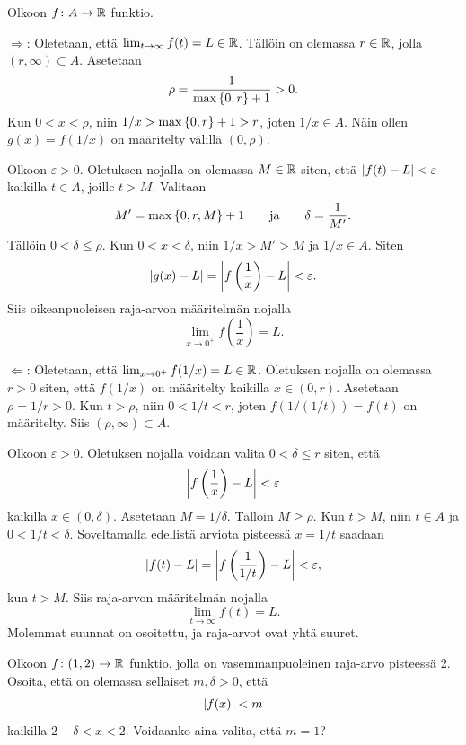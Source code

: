 \documentclass[11pt,a4paper]{amsart}
\begin{document}
\begin{solution}
  Olkoon \(f\colon A \to \RR\) funktio.

  \(\Rightarrow\): Oletetaan, että
  \(\lim_{t \to \infty} f(t) = L \in \RR\).
  Tällöin on olemassa \(r \in \RR\), jolla \((r,\infty) \subset A\).
  Asetetaan
  \[
    \rho = \frac{1}{\maxset{0,r} + 1} > 0.
  \]
  Kun \(0 < x < \rho\), niin
  \(1/x > \maxset{0,r} + 1 > r\), joten \(1/x \in A\).
  Näin ollen \(g(x) = f(1/x)\) on määritelty välillä \((0,\rho)\).

  Olkoon \(\varepsilon > 0\). Oletuksen nojalla on olemassa
  \(M \in \RR\) siten, että \(\abs{f(t) - L} < \varepsilon\)
  kaikilla \(t \in A\), joille \(t > M\). Valitaan
  \[
    M' = \maxset{0,r,M} + 1
    \qquad\text{ja}\qquad
    \delta = \frac{1}{M'}.
  \]
  Tällöin \(0 < \delta \leq \rho\). Kun \(0 < x < \delta\),
  niin \(1/x > M' > M\) ja \(1/x \in A\). Siten
  \[
    \abs{g(x) - L}
    = \abs*{f\left(\frac{1}{x}\right) - L} < \varepsilon.
  \]
  Siis oikeanpuoleisen raja-arvon määritelmän nojalla
  \[
    \lim_{x \to 0^+} f\left(\frac{1}{x}\right) = L.
  \]

  \(\Leftarrow\): Oletetaan, että
  \(\lim_{x \to 0^+} f(1/x) = L \in \RR\).
  Oletuksen nojalla on olemassa \(r > 0\) siten, että \(f(1/x)\)
  on määritelty kaikilla \(x \in (0,r)\). Asetetaan \(\rho = 1/r > 0\).
  Kun \(t > \rho\), niin \(0 < 1/t < r\), joten
  \(f(1/(1/t)) = f(t)\) on määritelty. Siis \((\rho,\infty) \subset A\).

  Olkoon \(\varepsilon > 0\). Oletuksen nojalla voidaan valita
  \(0 < \delta \leq r\) siten, että
  \[
    \abs*{f\left(\frac{1}{x}\right) - L} < \varepsilon
  \]
  kaikilla \(x \in (0,\delta)\). Asetetaan \(M = 1/\delta\).
  Tällöin \(M \geq \rho\). Kun \(t > M\), niin \(t \in A\) ja
  \(0 < 1/t < \delta\). Soveltamalla edellistä arviota pisteessä
  \(x = 1/t\) saadaan
  \[
    \abs{f(t) - L}
    = \abs*{f\left(\frac{1}{1/t}\right) - L} < \varepsilon,
  \]
  kun \(t > M\). Siis raja-arvon määritelmän nojalla
  \[
    \lim_{t \to \infty} f(t) = L.
  \]
  Molemmat suunnat on osoitettu, ja raja-arvot ovat yhtä suuret.
\end{solution}

\begin{exercise}
  Olkoon \(f\colon (1,2) \to \RR\) funktio, jolla on vasemmanpuoleinen
  raja-arvo pisteessä 2. Osoita, että on olemassa sellaiset
  \(m, \delta > 0\), että
  \[
    \abs{f(x)} < m
  \]
  kaikilla \(2 - \delta < x < 2\). Voidaanko aina valita, että \(m = 1\)?
\end{exercise}
\end{document}
